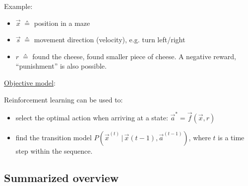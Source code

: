 \begin{frame}

Example:
\begin{itemize}
\item $\vec x \; \corresponds$ position in a maze
\item $\vec s \; \corresponds$ movement direction (velocity), e.g. turn left/right
\item $r \; \corresponds$ found the cheese, found smaller piece of cheese. A negative reward, ``punishment'' is also possible.
\end{itemize}
\end{frame}

\begin{frame}

\underline{Objective model}:

Reinforcement learning can be used to:
\begin{itemize}
\item select the optimal action when arriving at a state: $\vec a^* = \vec f(\vec x, r)$
\item find the transition model $P(\vec x^{(t)}\,|\,\vec x{(t-1)}, \vec a^{(t-1)})$, where $t$ is a time step within the sequence.
\end{itemize}
\pause
{}

\end{frame}

\newpage

\subsection{Summarized overview}

